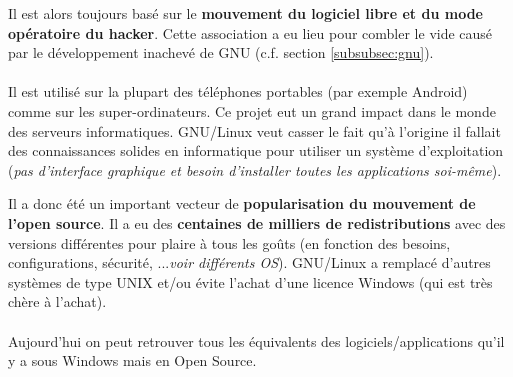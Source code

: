 Il est alors toujours basé sur le \textbf{mouvement du logiciel libre et du
mode opératoire du hacker}. Cette association a eu lieu pour combler le vide
causé par le développement inachevé de GNU (c.f. section \ref{subsubsec:gnu}).

\paragraph{} Il est utilisé sur la plupart des téléphones portables (par
exemple Android) comme sur les super-ordinateurs. Ce projet eut un grand impact
dans le monde des serveurs informatiques. GNU/Linux veut casser le fait qu'à
l'origine il fallait des connaissances solides en informatique pour utiliser un
système d'exploitation (\textit{pas d'interface graphique et besoin d'installer
toutes les applications soi-même}).

Il a donc été un important vecteur de \textbf{popularisation du mouvement de
l'open source}. Il a eu des \textbf{centaines de milliers de redistributions}
avec des versions différentes pour plaire à tous les goûts (en fonction des
besoins, configurations, sécurité, ...\textit{voir différents OS}). GNU/Linux a
remplacé d'autres systèmes de type UNIX et/ou évite l'achat d'une licence
Windows (qui est très chère à l'achat).

\paragraph{} Aujourd'hui on peut retrouver tous les équivalents des
logiciels/applications qu'il y a sous Windows mais en Open Source.
